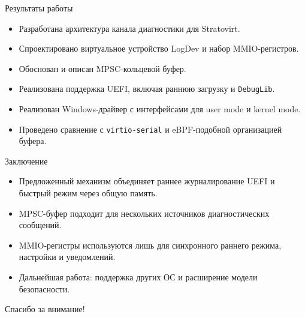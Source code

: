 \documentclass[aspectratio=169, 11pt]{beamer}
\begin{document}
\begin{frame}{Результаты работы}
    \begin{itemize}
        \item Разработана архитектура канала диагностики для Stratovirt.
        \item Спроектировано виртуальное устройство LogDev и набор MMIO-регистров.
        \item Обоснован и описан MPSC-кольцевой буфер.
        \item Реализована поддержка UEFI, включая раннюю загрузку и \texttt{DebugLib}.
        \item Реализован Windows-драйвер с интерфейсами для user mode и kernel mode.
        \item Проведено сравнение с \texttt{virtio-serial} и eBPF-подобной организацией буфера.
    \end{itemize}
\end{frame}

\begin{frame}{Заключение}
    \begin{itemize}
        \item Предложенный механизм объединяет раннее журналирование UEFI и быстрый режим через общую память.
        \item MPSC-буфер подходит для нескольких источников диагностических сообщений.
        \item MMIO-регистры используются лишь для синхронного раннего режима, настройки и уведомлений.
        \item Дальнейшая работа: поддержка других ОС и расширение модели безопасности.
    \end{itemize}

    \vspace{0.5cm}
    \centering
    \Large Спасибо за внимание!
\end{frame}
\end{document}
